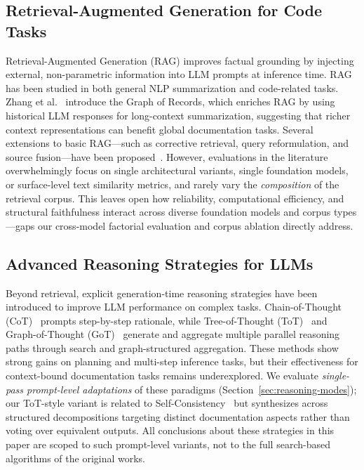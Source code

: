 \documentclass[pdflatex,sn-mathphys-ay]{sn-jnl}%
\theoremstyle{thmstyleone}%
\theoremstyle{thmstyletwo}%
\theoremstyle{thmstylethree}%
\begin{document}
\subsection{Retrieval-Augmented Generation for Code Tasks}
Retrieval-Augmented Generation (RAG) improves factual grounding by injecting external, non-parametric information into LLM prompts at inference time. RAG has been studied in both general NLP summarization and code-related tasks. Zhang et al.~\cite{zhang-etal-2025-graph} introduce the Graph of Records, which enriches RAG by using historical LLM responses for long-context summarization, suggesting that richer context representations can benefit global documentation tasks. Several extensions to basic RAG---such as corrective retrieval, query reformulation, and source fusion---have been proposed~\cite{codereview}. However, evaluations in the literature overwhelmingly focus on single architectural variants, single foundation models, or surface-level text similarity metrics, {\color{blue}
and rarely vary the \emph{composition} of the retrieval corpus. This leaves open how reliability, computational efficiency, and structural faithfulness interact across diverse foundation models and corpus types---gaps our cross-model factorial evaluation and corpus ablation directly address.
}


\subsection{Advanced Reasoning Strategies for LLMs}
Beyond retrieval, explicit generation-time reasoning strategies have been introduced to improve LLM performance on complex tasks. Chain-of-Thought (CoT)~\cite{cot} prompts step-by-step rationale, while Tree-of-Thought (ToT)~\cite{tot} and Graph-of-Thought (GoT)~\cite{got} generate and aggregate multiple parallel reasoning paths through search and graph-structured aggregation. These methods show strong gains on planning and multi-step inference tasks, but their effectiveness for context-bound documentation tasks remains underexplored. {\color{blue}
We evaluate \emph{single-pass prompt-level adaptations} of these paradigms (Section~\ref{sec:reasoning-modes}); our ToT-style variant is related to Self-Consistency~\cite{wang2023selfconsistency} but synthesizes across structured decompositions targeting distinct documentation aspects rather than voting over equivalent outputs. All conclusions about these strategies in this paper are scoped to such prompt-level variants, not to the full search-based algorithms of the original works.
}
\end{document}
